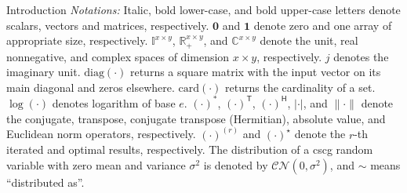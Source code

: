 \documentclass[journal]{IEEEtran}
\begin{document}
\begin{section}{Introduction}
	\emph{Notations:}
	Italic, bold lower-case, and bold upper-case letters denote scalars, vectors and matrices, respectively.
	$\boldsymbol{0}$ and $\boldsymbol{1}$ denote zero and one array of appropriate size, respectively. $\mathbb{I}^{x \times y}$, $\mathbb{R}_+^{x \times y}$, and $\mathbb{C}^{x \times y}$ denote the unit, real nonnegative, and complex spaces of dimension $x \times y$, respectively.
	$j$ denotes the imaginary unit.
	$\mathrm{diag}(\cdot)$ returns a square matrix with the input vector on its main diagonal and zeros elsewhere.
	$\mathrm{card}(\cdot)$ returns the cardinality of a set.
	$\log(\cdot)$ denotes logarithm of base $e$.
	$(\cdot)^*$, $(\cdot)^\mathsf{T}$, $(\cdot)^\mathsf{H}$, $\lvert{\cdot}\rvert$, and $\lVert{\cdot}\rVert$ denote the conjugate, transpose, conjugate transpose (Hermitian), absolute value, and Euclidean norm operators, respectively.
	$(\cdot)^{(r)}$ and $(\cdot)^{\star}$ denote the $r$-th iterated and optimal results, respectively.
	The distribution of a \gls{cscg} random variable with zero mean and variance $\sigma^2$ is denoted by $\mathcal{CN}(0,\sigma^2)$, and $\sim$ means ``distributed as''.
\end{section}
\end{document}
